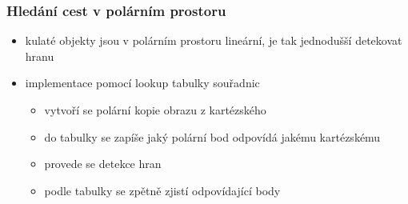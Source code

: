 \documentclass{beamer}
\begin{document}
	\begin{frame}[t,fragile]
		\frametitle{Hledání cest v polárním prostoru}	

		
		\begin{itemize}
\item kulaté objekty jsou v polárním prostoru lineární, je tak jednodušší detekovat hranu
\item implementace pomocí lookup tabulky souřadnic
\begin{itemize}
\item vytvoří se polární kopie obrazu z kartézského
\item do tabulky se zapíše jaký polární bod odpovídá jakému kartézskému
\item provede se detekce hran
\item podle tabulky se zpětně zjistí odpovídající body
\end{itemize}
\end{itemize}
	\end{frame}
	
\end{document}
